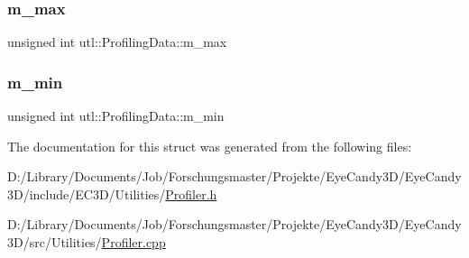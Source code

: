 \subsubsection{\texorpdfstring{m\+\_\+max}{m\_max}}
{\footnotesize\ttfamily unsigned int utl\+::\+Profiling\+Data\+::m\+\_\+max}

\mbox{\label{structutl_1_1_profiling_data_a61e7406f3b528d1740ce266673cc725b}} 
\subsubsection{\texorpdfstring{m\+\_\+min}{m\_min}}
{\footnotesize\ttfamily unsigned int utl\+::\+Profiling\+Data\+::m\+\_\+min}



The documentation for this struct was generated from the following files\+:\begin{DoxyCompactItemize}
\item 
D\+:/\+Library/\+Documents/\+Job/\+Forschungsmaster/\+Projekte/\+Eye\+Candy3\+D/\+Eye\+Candy3\+D/include/\+E\+C3\+D/\+Utilities/\mbox{\hyperlink{_profiler_8h}{Profiler.\+h}}\item 
D\+:/\+Library/\+Documents/\+Job/\+Forschungsmaster/\+Projekte/\+Eye\+Candy3\+D/\+Eye\+Candy3\+D/src/\+Utilities/\mbox{\hyperlink{_profiler_8cpp}{Profiler.\+cpp}}\end{DoxyCompactItemize}
